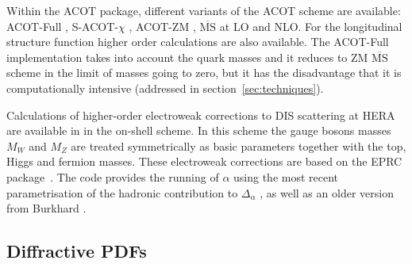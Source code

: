 \begin{description}
\begin{itemize}
%
Within the ACOT package, different variants of the ACOT scheme are available:
ACOT-Full \cite{Aivazis:1993pi}, S-ACOT-$\chi$ \cite{Kramer:2000hn,Kretzer:2003it}, ACOT-ZM \cite{Aivazis:1993pi}, 
$\overline{\text{MS}}$ at LO and NLO. 
For the longitudinal structure function higher order calculations are also available. 
The ACOT-Full implementation takes into account the quark masses 
and it reduces to ZM $\overline{\text{MS}}$ scheme in the limit of masses going to zero, 
but it has the disadvantage that it is computationally intensive (addressed in 
section~\ref{sec:techniques}).

\end{itemize}
\end{description}

Calculations of higher-order electroweak corrections to DIS scattering at 
HERA are available in \fitter in the on-shell scheme. In this scheme the
gauge bosons masses $M_W$ and 
$M_Z$ are treated symmetrically as basic parameters together with the top, 
Higgs and fermion masses.
These electroweak corrections 
are based on the EPRC package~\cite{SpiesbergerPrivComm}.
The code provides the running of $\alpha$ using the most recent parametrisation
of the hadronic contribution to $\Delta_\alpha$ \cite{Jegerlehner}, as well as 
an older version from Burkhard \cite{Burkhard}.



\subsection{Diffractive PDFs}

